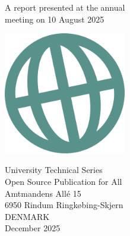 \documentclass[
  oneside,
  open=any]{scrbook}
\newcommand{\titlepageaffiliationfont}{\titlepagefont}
\newcommand{\titlepagefooterfont}{\titlepagefont}
\newcommand{\titlepageheaderfont}{\titlepagefont}
\begin{document}
\begin{frontmatter}
\begin{titlepage}
{\vspace{\afterauthor}
}

\newcommand{\affiliationblock}{
{\titlepageaffiliationalign
\titlepageaffiliationfont
\titlepageaffiliationblock
}
\newlength{\afteraffiliation}
\setlength{\afteraffiliation}{0pt}

\vspace{\afteraffiliation}
}

\newcommand{\logoblock}{
{\titlepagelogoalign
\includegraphics[width=0.4\textwidth]{img/logo.png}
}
\newlength{\afterlogo}
\setlength{\afterlogo}{1cm}

\vspace{\afterlogo}
}

\newcommand{\footerblock}{
{\titlepagefooteralign
\titlepagefooterfont
{\noindent University Technical Series\\
Open Source Publication for All\\
Amtmandens Allé 15\\
6950 Rindum Ringkøbing-Skjern\\
DENMARK\\
December 2025}\\
}
\newlength{\afterfooter}
\setlength{\afterfooter}{0pt}

\vspace{\afterfooter}
}

\newcommand{\headerblock}{
{\titlepageheaderalign
\titlepageheaderfont
{\noindent The Publisher}\\
}
\newlength{\afterheader}
\setlength{\afterheader}{0pt}

\vspace{\afterheader}
}




\thispagestyle{empty} %

\newlength{\minipagewidth}
\setlength{\minipagewidth}{\textwidth}
\raggedright
\begin{minipage}[b][\textheight][s]{\minipagewidth}
\titlepagepagealign
\titleblock
\authorblock
\vfill
A report presented at the annual\\meeting on 10 August 2025\\ \vspace{0.8cm}
\logoblock
\footerblock
\end{minipage}


\end{titlepage}
\end{frontmatter}
\end{document}

